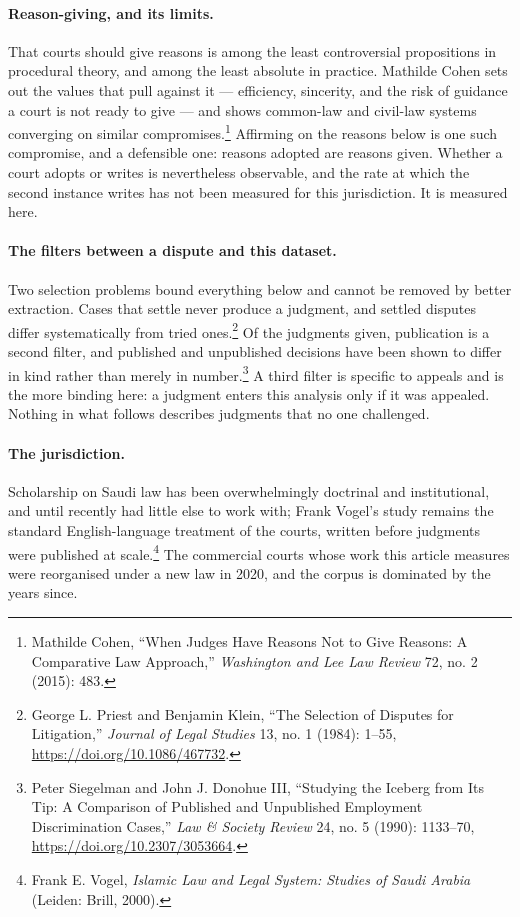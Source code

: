 \documentclass[11pt]{article}
\begin{document}
\paragraph{Reason-giving, and its limits.} That courts should give reasons is
among the least controversial propositions in procedural theory, and among
the least absolute in practice. Mathilde Cohen sets out the values that pull
against it --- efficiency, sincerity, and the risk of guidance a court is not
ready to give --- and shows common-law and civil-law systems converging on
similar compromises.\footnote{%
Mathilde Cohen, ``When Judges Have Reasons Not to Give Reasons: A Comparative
Law Approach,'' \emph{Washington and Lee Law Review} 72, no. 2 (2015): 483.} Affirming on the reasons below is one such compromise,
and a defensible one: reasons adopted are reasons given. Whether a court
adopts or writes is nevertheless observable, and the rate at which the second
instance writes has not been measured for this jurisdiction. It is measured
here.

\paragraph{The filters between a dispute and this dataset.} Two selection
problems bound everything below and cannot be removed by better extraction.
Cases that settle never produce a judgment, and settled disputes differ
systematically from tried ones.\footnote{%
George L. Priest and Benjamin Klein, ``The Selection of Disputes for
Litigation,'' \emph{Journal of Legal Studies} 13, no. 1 (1984): 1--55,
\url{https://doi.org/10.1086/467732}.} Of the judgments
given, publication is a second filter, and published and unpublished
decisions have been shown to differ in kind rather than merely in
number.\footnote{%
Peter Siegelman and John J. Donohue III, ``Studying the Iceberg from Its Tip:
A Comparison of Published and Unpublished Employment Discrimination Cases,''
\emph{Law \& Society Review} 24, no. 5 (1990): 1133--70,
\url{https://doi.org/10.2307/3053664}.} A third filter is specific to appeals and is
the more binding here: a judgment enters this analysis only if it was
appealed. Nothing in what follows describes judgments that no one challenged.

\paragraph{The jurisdiction.} Scholarship on Saudi law has been overwhelmingly
doctrinal and institutional, and until recently had little else to work with;
Frank Vogel's study remains the standard English-language treatment of the
courts, written before judgments were published at scale.\footnote{%
Frank E. Vogel, \emph{Islamic Law and Legal System: Studies of Saudi Arabia}
(Leiden: Brill, 2000).} The commercial courts whose
work this article measures were reorganised under a new law in 2020, and the
corpus is dominated by the years since.
\end{document}
